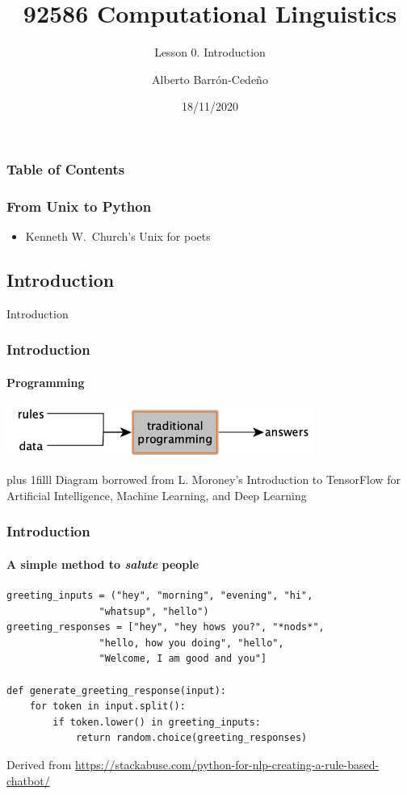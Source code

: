 \documentclass{beamer}
\title{92586 Computational Linguistics}
\subtitle{Lesson 0. Introduction}
\author{Alberto Barr\'on-Cede\~no}
\institute[DIT--UniBO]{Alma Mater Studiorum-Universit\`a di Bologna \\
\texttt{a.barron@unibo.it\hspace{10mm}@\_albarron\_}
}
\date{18/11/2020}
\newcommand{\btVFill}{\vskip0pt plus 1filll}
\begin{document}
\frame{\titlepage}


\begin{frame}
\frametitle{Table of Contents}
\tableofcontents
\end{frame}


\begin{frame}
\frametitle{From Unix to Python}

\begin{itemize}
  \item Kenneth W.\ Church's \alert{Unix for poets}
\end{itemize}
\end{frame}



\begin{frame}
\section{Introduction}
\centering
\alert{Introduction}
\end{frame}

\begin{frame}
\frametitle{Introduction}
\framesubtitle{Programming}
\vspace{5mm}

\begin{center}
\includegraphics[width=100mm]{img/coli2020_diagrams_traditional_programming.png}
\end{center}

\btVFill
\footnotesize
Diagram borrowed from L. Moroney's Introduction to TensorFlow for Artificial Intelligence, Machine Learning, and Deep Learning
\end{frame}

\begin{frame}[fragile]
\frametitle{Introduction}
\framesubtitle{A simple method to \textit{salute} people}
\vspace{5mm}

\begin{block}{}
\begin{verbatim}
greeting_inputs = ("hey", "morning", "evening", "hi",
                "whatsup", "hello")
greeting_responses = ["hey", "hey hows you?", "*nods*",
                "hello, how you doing", "hello",
                "Welcome, I am good and you"]

def generate_greeting_response(input):
    for token in input.split():
        if token.lower() in greeting_inputs:
            return random.choice(greeting_responses)
\end{verbatim}
\end{block}

\onslide
\footnotesize
Derived from
\url{https://stackabuse.com/python-for-nlp-creating-a-rule-based-chatbot/}
\end{frame}
\end{document}
